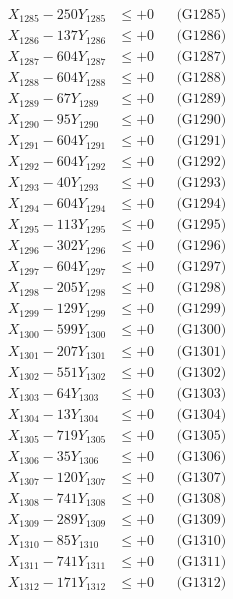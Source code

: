 \documentclass[a4paper,10pt]{article}
\begin{document}
{\begin{align}
X_{1285} - 250Y_{1285} &\leq +0 && \text{(G1285)} \\
X_{1286} - 137Y_{1286} &\leq +0 && \text{(G1286)} \\
X_{1287} - 604Y_{1287} &\leq +0 && \text{(G1287)} \\
X_{1288} - 604Y_{1288} &\leq +0 && \text{(G1288)} \\
X_{1289} - 67Y_{1289} &\leq +0 && \text{(G1289)} \\
X_{1290} - 95Y_{1290} &\leq +0 && \text{(G1290)} \\
\allowbreak
X_{1291} - 604Y_{1291} &\leq +0 && \text{(G1291)} \\
X_{1292} - 604Y_{1292} &\leq +0 && \text{(G1292)} \\
X_{1293} - 40Y_{1293} &\leq +0 && \text{(G1293)} \\
X_{1294} - 604Y_{1294} &\leq +0 && \text{(G1294)} \\
X_{1295} - 113Y_{1295} &\leq +0 && \text{(G1295)} \\
X_{1296} - 302Y_{1296} &\leq +0 && \text{(G1296)} \\
X_{1297} - 604Y_{1297} &\leq +0 && \text{(G1297)} \\
X_{1298} - 205Y_{1298} &\leq +0 && \text{(G1298)} \\
X_{1299} - 129Y_{1299} &\leq +0 && \text{(G1299)} \\
X_{1300} - 599Y_{1300} &\leq +0 && \text{(G1300)} \\
\allowbreak
X_{1301} - 207Y_{1301} &\leq +0 && \text{(G1301)} \\
X_{1302} - 551Y_{1302} &\leq +0 && \text{(G1302)} \\
X_{1303} - 64Y_{1303} &\leq +0 && \text{(G1303)} \\
X_{1304} - 13Y_{1304} &\leq +0 && \text{(G1304)} \\
X_{1305} - 719Y_{1305} &\leq +0 && \text{(G1305)} \\
X_{1306} - 35Y_{1306} &\leq +0 && \text{(G1306)} \\
X_{1307} - 120Y_{1307} &\leq +0 && \text{(G1307)} \\
X_{1308} - 741Y_{1308} &\leq +0 && \text{(G1308)} \\
X_{1309} - 289Y_{1309} &\leq +0 && \text{(G1309)} \\
X_{1310} - 85Y_{1310} &\leq +0 && \text{(G1310)} \\
\allowbreak
X_{1311} - 741Y_{1311} &\leq +0 && \text{(G1311)} \\
X_{1312} - 171Y_{1312} &\leq +0 && \text{(G1312)} \\

\end{align}}
\end{document}

